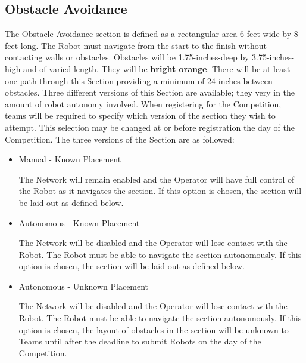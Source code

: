 \subsection{Obstacle Avoidance}
The Obstacle Avoidance section is defined as a rectangular area 6 feet wide by 8 feet long. The Robot must navigate from the start to the finish without contacting walls or obstacles. Obstacles will be 1.75-inches-deep by 3.75-inches-high and of varied length. They will be \textbf{bright orange}. There will be at least one path through this Section providing a minimum of 24 inches between obstacles. Three different versions of this Section are available; they very in the amount of robot autonomy involved. When registering for the Competition, teams will be required to specify which version of the section they wish to attempt. This selection may be changed at or before registration the day of the Competition. The three versions of the Section are as followed:

\begin{itemize}
    \item Manual - Known Placement
    
        The Network will remain enabled and the Operator will have full control of the Robot as it navigates the section. If this option is chosen, the section will be laid out as defined below.
    \item Autonomous - Known Placement
    
        The Network will be disabled and the Operator will lose contact with the Robot. The Robot must be able to navigate the section autonomously. If this option is chosen, the section will be laid out as defined below.
    \item Autonomous - Unknown Placement
    
        The Network will be disabled and the Operator will lose contact with the Robot. The Robot must be able to navigate the section autonomously. If this option is chosen, the layout of obstacles in the section will be unknown to Teams until after the deadline to submit Robots on the day of the Competition. 
        
\end{itemize}